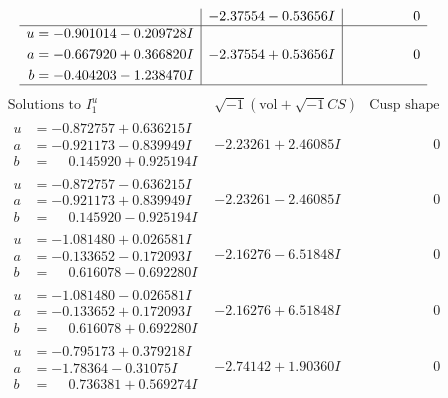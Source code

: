 \documentclass[1p]{elsarticle_modified}
\theoremstyle{definition}
\newcommand{\I}{\sqrt{-1}}
\begin{document}
$$\begin{array}{c|c|c}
 & -2.37554 - 0.53656 I & \phantom{-0.000000 } 0 \\ \hline\begin{aligned}
u &= -0.901014 - 0.209728 I \\
a &= -0.667920 + 0.366820 I \\
b &= -0.404203 - 1.238470 I\end{aligned}
 & -2.37554 + 0.53656 I & \phantom{-0.000000 } 0\\
 \hline 
 \end{array}$$\newpage$$\begin{array}{c|c|c}  
\text{Solutions to }I^u_{1}& \I (\text{vol} + \sqrt{-1}CS) & \text{Cusp shape}\\
 \hline 
\begin{aligned}
u &= -0.872757 + 0.636215 I \\
a &= -0.921173 - 0.839949 I \\
b &= \phantom{-}0.145920 + 0.925194 I\end{aligned}
 & -2.23261 + 2.46085 I & \phantom{-0.000000 } 0 \\ \hline\begin{aligned}
u &= -0.872757 - 0.636215 I \\
a &= -0.921173 + 0.839949 I \\
b &= \phantom{-}0.145920 - 0.925194 I\end{aligned}
 & -2.23261 - 2.46085 I & \phantom{-0.000000 } 0 \\ \hline\begin{aligned}
u &= -1.081480 + 0.026581 I \\
a &= -0.133652 - 0.172093 I \\
b &= \phantom{-}0.616078 - 0.692280 I\end{aligned}
 & -2.16276 - 6.51848 I & \phantom{-0.000000 } 0 \\ \hline\begin{aligned}
u &= -1.081480 - 0.026581 I \\
a &= -0.133652 + 0.172093 I \\
b &= \phantom{-}0.616078 + 0.692280 I\end{aligned}
 & -2.16276 + 6.51848 I & \phantom{-0.000000 } 0 \\ \hline\begin{aligned}
u &= -0.795173 + 0.379218 I \\
a &= -1.78364 - 0.31075 I \\
b &= \phantom{-}0.736381 + 0.569274 I\end{aligned}
 & -2.74142 + 1.90360 I & \phantom{-0.000000 } 0 \\ \hline\begin{aligned}

\end{aligned}
\end{array}$$
\end{document}
